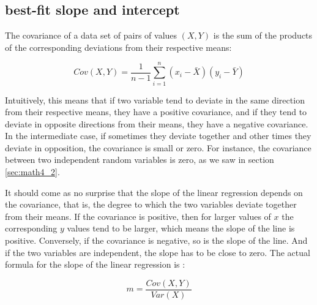 \documentclass[
  letterpaper,
  DIV=11,
  numbers=noendperiod]{scrreprt}
\begin{document}
\hypertarget{best-fit-slope-and-intercept}{%
\subsection{best-fit slope and
intercept}\label{best-fit-slope-and-intercept}}

\begin{tcolorbox}[enhanced jigsaw, coltitle=black, arc=.35mm, opacitybacktitle=0.6, breakable, bottomtitle=1mm, toptitle=1mm, titlerule=0mm, colback=white, leftrule=.75mm, rightrule=.15mm, colframe=quarto-callout-note-color-frame, colbacktitle=quarto-callout-note-color!10!white, opacityback=0, title=\textcolor{quarto-callout-note-color}{\faInfo}\hspace{0.5em}{Definition}, left=2mm, toprule=.15mm, bottomrule=.15mm]

The  covariance of a data set of pairs of values
\((X,Y)\) is the sum of the products of the corresponding deviations
from their respective means:

\end{tcolorbox}

\[ Cov(X,Y) = \frac{1}{n-1} \sum_{i=1}^n (x_i - \bar X) (y_i - \bar Y) 
\]

Intuitively, this means that if two variable tend to deviate in the same
direction from their respective means, they have a positive covariance,
and if they tend to deviate in opposite directions from their means,
they have a negative covariance. In the intermediate case, if sometimes
they deviate together and other times they deviate in opposition, the
covariance is small or zero. For instance, the covariance between two
independent random variables is zero, as we saw in section
\ref{sec:math4_2}.

It should come as no surprise that the slope of the linear regression
depends on the covariance, that is, the degree to which the two
variables deviate together from their means. If the covariance is
positive, then for larger values of \(x\) the corresponding \(y\) values
tend to be larger, which means the slope of the line is positive.
Conversely, if the covariance is negative, so is the slope of the line.
And if the two variables are independent, the slope has to be close to
zero. The actual formula for the
slope of
the linear regression is \cite{whitlock_analysis_2008}:

\begin{equation}
m = \frac{Cov(X,Y)}{Var(X)}
\end{equation}
\end{document}

